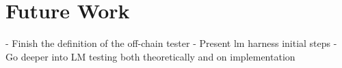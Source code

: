 \section{Future Work}\label{sec:ref}

- Finish the definition of the off-chain tester
- Present lm harness initial steps
- Go deeper into LM testing both theoretically and on implementation

